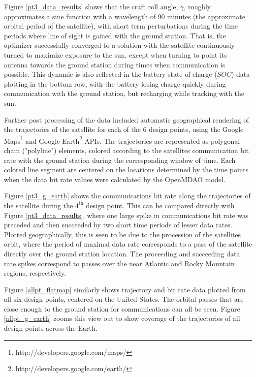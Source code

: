 \documentclass[]{aiaa-tc} %
\begin{document}
        Figure \ref{pt3_data_results} shows that the craft roll angle, $\gamma$, roughly approximates a sine function
        with a wavelength of 90 minutes (the approximate orbital period of the satellite),
        with short term perturbations during the time
        periods where line of sight is gained with the ground station. That is, the optimizer successfully
        converged to a solution with the satellite continuously turned to maximize exposure to the sun,
        except when turning to point its antenna towards the ground station during times when
        communication is possible. This dynamic is also reflected in the battery state of charge ($SOC$)
        data plotting in the bottom row, with the battery losing charge quickly during
        communication with the ground station, but recharging while tracking with the sun.

        Further post processing of the data included automatic geographical rendering of the trajectories of
        the  satellite for each of the 6 design points, using the Google
        Maps\footnote{http://developers.google.com/maps/} and Google
        Earth\footnote{http://developers.google.com/earth/} APIs. The trajectories are
        represented as polygonal chain ("polyline") elements, colored according to the
        satellites communication bit rate with the ground station during the corresponding
        window of time. Each colored line segment are centered on the locations
        determined by the time points when the data bit rate values were calculated
        by the OpenMDAO model.

        Figure \ref{pt3_g_earth} shows the communications bit rate along the trajectories of the
        satellite during the $4^{\textrm{th}}$ design point. This can be compared
        directly with Figure \ref{pt3_data_results}, where one large spike in communications
        bit rate was preceded and then succeeded by two short time periods of lesser
        data rates. Plotted geographically, this is seen to be due to the procession of
        the satellites orbit, where the period of maximal data rate corresponds to a
        pass of the satellite directly over the ground station location. The proceeding and
        succeeding data rate spikes correspond to passes over the near Atlantic and
        Rocky Mountain regions, respectively.


        Figure \ref{allpt_flatmap} similarly shows trajectory and bit rate data plotted
        from all six design points, centered on the United States. The orbital passes
        that are close enough to the ground station for communications can all be seen.
        Figure \ref{allpt_g_earth} zooms this view out to show coverage of the trajectories
        of all design points across the Earth.
\end{document}
